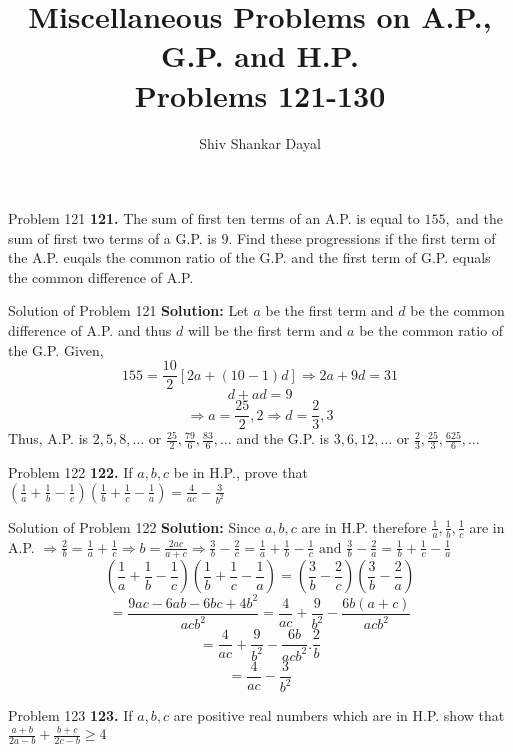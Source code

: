 \documentclass[aspectratio=1610,8pt]{beamer}
\title{Miscellaneous Problems on A.P., G.P. and H.P.\\Problems 121-130}
\author[Shiv Shankar Dayal]{Shiv Shankar Dayal}
\begin{document}
\begin{frame}
  \titlepage
\end{frame}
\begin{frame}{Problem 121}
  \textbf{121.} The sum of first ten terms of an A.P. is equal to $155,$ and the sum of first two terms of a G.P. is $9.$ Find
  these progressions if the first term of the A.P. euqals the common ratio of the G.P. and the first term of G.P. equals the common
  difference of A.P.
\end{frame}
\begin{frame}{Solution of Problem 121}
  \textbf{Solution:} Let $a$ be the first term and $d$ be the common difference of A.P. and thus $d$ will be the first term and $a$
  be the common ratio of the G.P. Given,
  $$155 = \frac{10}{2}[2a + (10 - 1)d] \Rightarrow 2a + 9d = 31$$
  $$d + ad = 9$$
  $$\Rightarrow a = \frac{25}{2}, 2 \Rightarrow d = \frac{2}{3}, 3$$
  Thus, A.P. is $2, 5, 8, \ldots$ or $\frac{25}{2}, \frac{79}{6}, \frac{83}{6}, \ldots$ and the G.P. is $3, 6, 12, \ldots$ or
  $\frac{2}{3}, \frac{25}{3}, \frac{625}{6}, \ldots$
\end{frame}
\begin{frame}{Problem 122}
  \textbf{122.} If $a, b, c$ be in H.P., prove that $\left(\frac{1}{a} + \frac{1}{b} - \frac{1}{c}\right)\left(\frac{1}{b} +
  \frac{1}{c} - \frac{1}{a}\right) = \frac{4}{ac} - \frac{3}{b^2}$
\end{frame}
\begin{frame}{Solution of Problem 122}
  \textbf{Solution:} Since $a, b, c$ are in H.P. therefore $\frac{1}{a}, \frac{1}{b}, \frac{1}{c}$ are in A.P.
  \linebreak\linebreak
  $\Rightarrow \frac{2}{b} = \frac{1}{a} + \frac{1}{c} \Rightarrow b = \frac{2ac}{a + c} \Rightarrow \frac{3}{b} - \frac{2}{c} =
  \frac{1}{a} + \frac{1}{b} - \frac{1}{c} \text{~and~}\frac{3}{b} - \frac{2}{a} = \frac{1}{b} + \frac{1}{c} - \frac{1}{a}$
  $$\left(\frac{1}{a} + \frac{1}{b} - \frac{1}{c}\right)\left(\frac{1}{b} + \frac{1}{c} - \frac{1}{a}\right) = \left(\frac{3}{b} -
  \frac{2}{c}\right)\left(\frac{3}{b} - \frac{2}{a}\right)$$
  $$= \frac{9ac - 6ab - 6bc + 4b^2}{acb^2} = \frac{4}{ac} + \frac{9}{b^2} - \frac{6b(a + c)}{acb^2}$$
  $$= \frac{4}{ac} + \frac{9}{b^2} - \frac{6b}{acb^2}.\frac{2}{b}$$
  $$= \frac{4}{ac} - \frac{3}{b^2}$$
\end{frame}
\begin{frame}{Problem 123}
  \textbf{123.} If $a, b, c$ are positive real numbers which are in H.P. show that $\frac{a + b}{2a - b} + \frac{b + c}{2c - b}\geq
  4$
\end{frame}
\end{document}
